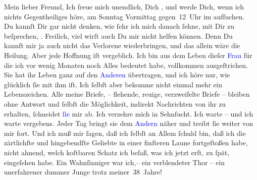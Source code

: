 \pstart\center{}Mein lieber Freund,\pend
\pstart
           Ich freue mich unendlich, Dich \label{K_L03363-1v}\label{K_L03363-1h}, und werde Dich, wenn ich nichts Gegentheiliges
               höre, am Sonntag{ }Vormittag gegen 12 Uhr im \label{K_L03363-2v}\label{K_L03363-2h} aufſuchen. Du kannſt Dir gar nicht
               denken, wie ſehr ich mich danach ſehne, mit Dir zu beſprechen, \label{K_L03363-3v}\label{K_L03363-3h}.
               Freilich, viel wirſt auch Du mir nicht helfen können. {\pb}Denn Du kannſt mir ja auch nicht das Verlorene
               wiederbringen, und das allein wäre die Heilung. Aber jede Hoffnung iſt vergeblich.
               Ich bin aus dem Leben dieſer \textcolor{blue}{Frau}{}\ledrightnote{{$\rightarrow$}\textcolor{blue}{Theodore Rottenberg}}{ } für die ich vor wenig Monaten noch Alles
               bedeutet habe, vollkommen ausgeſtrichen. Sie hat ihr Leben ganz auf den \textcolor{blue}{Anderen}{}\ledrightnote{{$\rightarrow$}\textcolor{blue}{?? [Partner von Theodore Rottenberg, Ende 1902/Anfang 1903]}} übertragen, und ich
               höre nur, wie glücklich ſie mit ihm iſt. Ich ſelbſt aber bekomme nicht einmal mehr
               ein Lebenszeichen. Alle meine Briefe, – flehende, reuige, verzweifelte Briefe – {\pb}bleiben ohne Antwort und ſelbſt die Möglichkeit,
               indirekt Nachrichten\strikeout{\textcolor{gray}{×}} von ihr zu erhalten, ſchneidet \textcolor{blue}{ſie}{}\ledrightnote{{$\rightarrow$}\textcolor{blue}{Theodore Rottenberg}} mir ab. Ich verzehre mich in Sehnſucht. Ich warte – und
               ich warte vergebens. Jeder Tag bringt sie dem \textcolor{blue}{Andern}{}\ledrightnote{{$\rightarrow$}\textcolor{blue}{?? [Partner von Theodore Rottenberg, Ende 1902/Anfang 1903]}} näher und treibt ſie weiter von mir fort. Und ich
               muß mir ſagen, daß ich ſelbſt an Allem ſchuld \introOben{}bin\introOben{}, daß ich
               die zärtlichſte und hingebendſte Geliebte in einer finſteren Laune fortgeſtoßen habe,
               nicht ahnend, {\pb}welch koſtbaren Schatz ich beſaß, was
               ich jetzt erſt, zu ſpät, eingeſehen habe. Ein Wahnſinniger war ich,– ein verblendeter
               Thor – ein unerfahrener dummer Junge trotz meiner 38 Jahre! {\dotsfour}\pend
           
